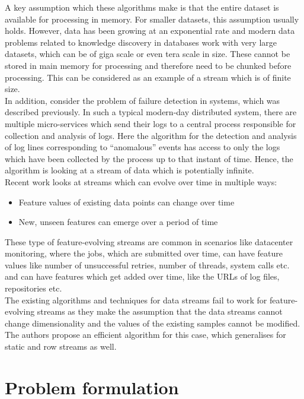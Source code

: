 A key assumption which these algorithms make is that the entire dataset is available for processing in memory. For smaller datasets, this assumption usually holds. However, data has been growing at an exponential rate and modern data problems related to knowledge discovery in databases work with very large datasets, which can be of giga scale or even tera scale in size. These cannot be stored in main memory for processing and therefore need to be chunked before processing. This can be considered as an example of a stream which is of finite size. \\

In addition, consider the problem of failure detection in systems, which was described previously. In such a typical modern-day distributed system, there are multiple micro-services which send their logs to a central process responsible for collection and analysis of logs. Here the algorithm for the detection and analysis of log lines corresponding to ``anomalous'' events has access to only the logs which have been collected by the process up to that instant of time. Hence, the algorithm is looking at a stream of data which is potentially infinite. \\

Recent work\cite{Manzoor:2018:XOD:3219819.3220107} looks at streams which can evolve over time in multiple ways:

\begin{itemize}
    \item Feature values of existing data points can change over time
    \item New, unseen features can emerge over a period of time
\end{itemize}

These type of feature-evolving streams are common in scenarios like datacenter monitoring, where the jobs, which are submitted over time, can have feature values like number of unsuccessful retries, number of threads, system calls etc. and can have features which get added over time, like the URLs of log files, repositories etc. \\

The existing algorithms and techniques for data streams fail to work for feature-evolving streams as they make the assumption that the data streams cannot change dimensionality and the values of the existing samples cannot be modified. The authors propose an efficient algorithm for this case, which generalises for static and row streams as well.

\section{Problem formulation}

